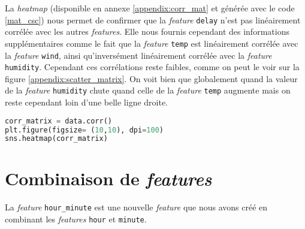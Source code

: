 La \textit{heatmap} (disponible en annexe \ref{appendix:corr_mat} et générée avec le code \ref{mat_csc}) nous permet de confirmer que la \textit{feature} \lstinline!delay! n'est pas linéairement corrélée avec les autres \textit{features}. Elle nous fournis cependant des informations supplémentaires comme le fait que la \textit{feature} \lstinline!temp! est linéairement corrélée avec la \textit{feature} \lstinline!wind!, ainsi qu'inversément linéairement corrélée avec la \textit{feature} \lstinline!humidity!. Cependant ces corrélations reste faibles, comme on peut le voir sur la figure \ref{appendix:scatter_matrix}. On voit bien que globalement quand la valeur de la \textit{feature} \lstinline!humidity! chute quand celle de la \textit{feature} \lstinline!temp! augmente mais on reste cependant loin d'une belle ligne droite.

\begin{lstlisting}[language=Python, caption=Matrice des coefficients standard de corrélation., label=mat_csc]
corr_matrix = data.corr()
plt.figure(figsize= (10,10), dpi=100)
sns.heatmap(corr_matrix)
\end{lstlisting}

\section{Combinaison de \textit{features}}
La \textit{feature} \lstinline!hour_minute! est une nouvelle \textit{feature} que nous avons créé en combinant les \textit{features} \lstinline!hour! et \lstinline!minute!.
